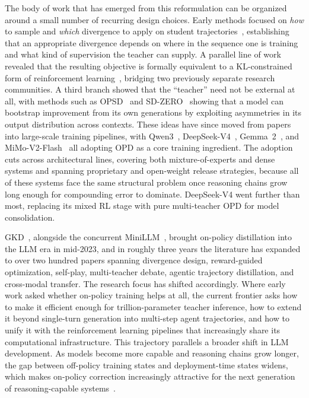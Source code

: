 \documentclass{article} %
\begin{document}
The body of work that has emerged from this reformulation can be organized around a small number of recurring design choices. Early methods focused on \emph{how} to sample and \emph{which} divergence to apply on student trajectories~\citep{2306.13649,2306.08543,2402.03898}, establishing that an appropriate divergence depends on where in the sequence one is training and what kind of supervision the teacher can supply. A parallel line of work revealed that the resulting objective is formally equivalent to a KL-constrained form of reinforcement learning~\citep{2602.12125}, bridging two previously separate research communities. A third branch showed that the ``teacher'' need not be external at all, with methods such as OPSD~\citep{2601.18734} and SD-ZERO~\citep{2604.12002} showing that a model can bootstrap improvement from its own generations by exploiting asymmetries in its output distribution across contexts. These ideas have since moved from papers into large-scale training pipelines, with Qwen3~\citep{2505.09388}, DeepSeek-V4~\citep{deepseekv4}, Gemma~2~\citep{2408.00118}, and MiMo-V2-Flash~\citep{2601.02780} all adopting OPD as a core training ingredient. The adoption cuts across architectural lines, covering both mixture-of-experts and dense systems and spanning proprietary and open-weight release strategies, because all of these systems face the same structural problem once reasoning chains grow long enough for compounding error to dominate. DeepSeek-V4 went further than most, replacing its mixed RL stage with pure multi-teacher OPD for model consolidation.

GKD~\citep{2306.13649}, alongside the concurrent MiniLLM~\citep{2306.08543}, brought on-policy distillation into the LLM era in mid-2023, and in roughly three years the literature has expanded to over two hundred papers spanning divergence design, reward-guided optimization, self-play, multi-teacher debate, agentic trajectory distillation, and cross-modal transfer. The research focus has shifted accordingly. Where early work asked whether on-policy training helps at all, the current frontier asks how to make it efficient enough for trillion-parameter teacher inference, how to extend it beyond single-turn generation into multi-step agent trajectories, and how to unify it with the reinforcement learning pipelines that increasingly share its computational infrastructure. This trajectory parallels a broader shift in LLM development. As models become more capable and reasoning chains grow longer, the gap between off-policy training states and deployment-time states widens, which makes on-policy correction increasingly attractive for the next generation of reasoning-capable systems~\citep{2603.25562,deepseekv4}.
\end{document}
